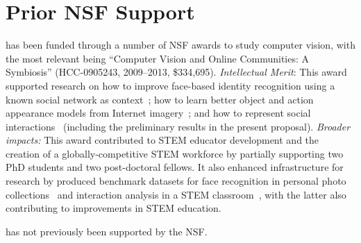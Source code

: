 \vspace{-8pt}
\section{Prior NSF Support}
\vspace{-10pt}
 has been funded through a number of NSF awards to study computer vision, with the most relevant being ``Computer Vision and Online Communities: A Symbiosis'' (HCC-0905243, 2009--2013, \$334,695). \emph{Intellectual Merit}: This award supported research on how to improve face-based identity recognition using a known social network as context~\cite{Stone2010}; how to learn better object and action appearance models from Internet imagery~\cite{owens2011learning,LiZickler2012}; and how to represent social interactions~\cite{groupdet2013} (including the preliminary results in the present proposal). \emph{Broader impacts:} This award contributed to STEM educator development and the creation of a globally-competitive STEM workforce by partially supporting two PhD students and two post-doctoral fellows. It also enhanced infrastructure for research by produced benchmark datasets for face recognition in personal photo collections~\cite{PintoZickler2011} and interaction analysis in a STEM classroom~\cite{groupdet2013}, with the latter also contributing to improvements in STEM education.

 has not previously been supported by the NSF.

